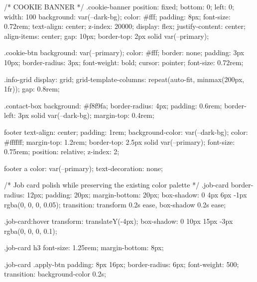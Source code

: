         /* COOKIE BANNER */
        .cookie-banner {
            position: fixed;
            bottom: 0;
            left: 0;
            width: 100%
            background: var(--dark-bg);
            color: #fff;
            padding: 8px;
            font-size: 0.72rem;
            text-align: center;
            z-index: 20000;
            display: flex;
            justify-content: center;
            align-items: center;
            gap: 10px;
            border-top: 2px solid var(--primary);
        }

        .cookie-btn {
            background: var(--primary);
            color: #fff;
            border: none;
            padding: 3px 10px;
            border-radius: 3px;
            font-weight: bold;
            cursor: pointer;
            font-size: 0.72rem;
        }

        .info-grid {
            display: grid;
            grid-template-columns: repeat(auto-fit, minmax(200px, 1fr));
            gap: 0.8rem;
        }

        .contact-box {
            background: #f8f9fa;
            border-radius: 4px;
            padding: 0.6rem;
            border-left: 3px solid var(--dark-bg);
            margin-top: 0.4rem;
        }

        footer {
            text-align: center;
            padding: 1rem;
            background-color: var(--dark-bg);
            color: #ffffff;
            margin-top: 1.2rem;
            border-top: 2.5px solid var(--primary);
            font-size: 0.75rem;
            position: relative;
            z-index: 2;
        }

        footer a {
            color: var(--primary);
            text-decoration: none;
        }

        /* Job card polish while preserving the existing color palette */
        .job-card {
            border-radius: 12px;
            padding: 20px;
            margin-bottom: 20px;
            box-shadow: 0 4px 6px -1px rgba(0, 0, 0, 0.05);
            transition: transform 0.2s ease, box-shadow 0.2s ease;
        }

        .job-card:hover {
            transform: translateY(-4px);
            box-shadow: 0 10px 15px -3px rgba(0, 0, 0, 0.1);
        }

        .job-card h3 {
            font-size: 1.25rem;
            margin-bottom: 8px;
        }

        .job-card .apply-btn {
            padding: 8px 16px;
            border-radius: 6px;
            font-weight: 500;
            transition: background-color 0.2s;
        }

